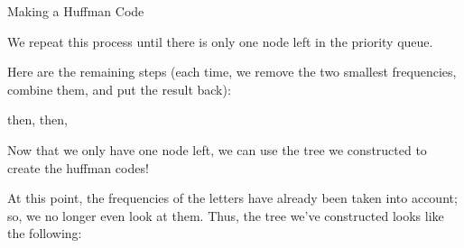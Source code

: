\documentclass[programming]{../../mfcs}
\begin{document}
\begin{question}{Making a Huffman Code}
    \vspace{1.0em}

    \centering We repeat this process until there is only one node left in the priority
    queue.

    \justifying\noindent
    Here are the remaining steps (each time, we remove the two smallest frequencies, combine
    them, and put the result back):

    \hspace*{-2.5em}
    {\scriptsize then,}
    {\scriptsize then,}

    \vspace{1em}

    \noindent Now that we only have one node left, we can use the tree we constructed to
    create the huffman codes!

    \noindent At this point, the frequencies of the letters have already been taken into
    account; so, we no longer even look at them.  Thus, the tree we've constructed looks
    like the following:


\end{question}
\end{document}
